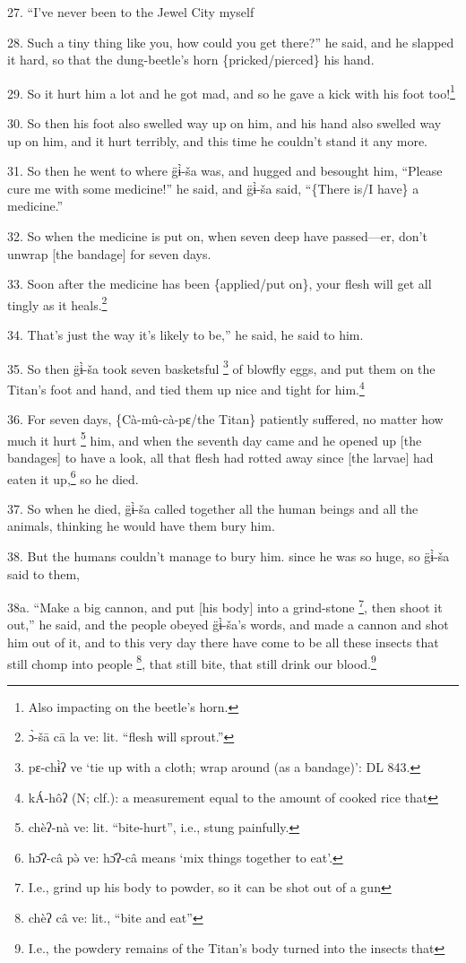 27. ``I've never been to the Jewel City myself

28. Such a tiny thing like you, how could you get there?'' he said, and he slapped
it hard, so that the dung-beetle's horn \{pricked/pierced\} his hand.

29. So it hurt him a lot and he got mad, and so he gave a kick with his foot too!\footnote{Also impacting on the beetle's horn.}

30. So then his foot also swelled way up on him, and his hand also swelled way
up on him, and it hurt terribly, and this time he couldn't stand it any more.

31. So then he went to where g̈ɨ̀-ša was, and hugged and besought him, ``Please
cure me with some medicine!'' he said, and g̈ɨ̀-ša said, ``\{There is/I have\}
a medicine.''

32. So when the medicine is put on, when seven deep have passed---er, don't unwrap
[the bandage] for seven days.

33. Soon after the medicine has been \{applied/put on\}, your flesh will get all
tingly as it heals.\footnote{ɔ̀-šā cā la ve: lit. ``flesh will sprout.''}

34. That's just the way it's likely to be,'' he said, he said to him.

35. So then g̈ɨ̀-ša took seven basketsful \footnote{pɛ-chɨ̀ʔ ve `tie up with a cloth; wrap around (as a bandage)': DL 843.} of blowfly eggs, and put them
on the Titan's foot and hand, and tied them up nice and tight for him.\footnote{kÁ-hôʔ (N; clf.): a measurement equal to the amount of cooked rice that}

36. For seven days, \{Cà-mû-cà-pɛ/the Titan\} patiently suffered, no matter
how much it hurt \footnote{chèʔ-nà ve: lit. ``bite-hurt'', i.e., stung painfully.} him, and when the seventh day came and he opened up [the
bandages] to have a look, all that flesh had rotted away since [the larvae] had
eaten it up,\footnote{hɔ̂ʔ-câ pə̀ ve: hɔ̂ʔ-câ means `mix things together to eat'.} so he died.

37. So when he died, g̈ɨ̀-ša called together all the human beings and all the
animals, thinking he would have them bury him.

38. But the humans couldn't manage to bury him. since he was so huge, so g̈ɨ̀-ša
said to them,

38a. ``Make a big cannon, and put [his body] into a grind-stone \footnote{I.e., grind up his body to powder, so it can be shot out of a gun}, then shoot
it out,'' he said, and the people obeyed g̈ɨ̀-ša's words, and made a cannon
and shot him out of it, and to this very day there have come to be all these insects
that still chomp into people \footnote{chèʔ câ ve: lit., ``bite and eat''}, that still bite, that still drink our blood.\footnote{I.e., the powdery remains of the Titan's body turned into the insects that}

